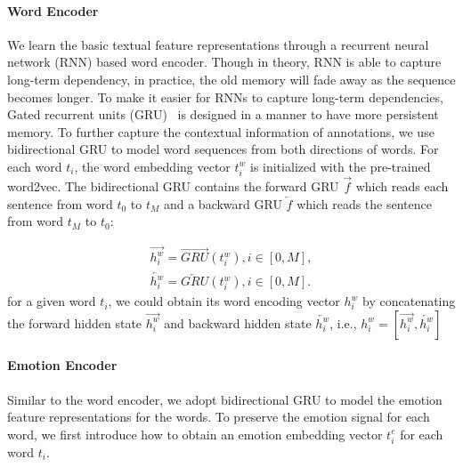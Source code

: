 \documentclass{article}
\begin{document}
	\paragraph{Word Encoder}
	We learn the basic textual feature representations through a recurrent neural network (RNN) based word encoder. Though in theory, RNN is able to capture long-term dependency, in practice, the old memory will fade away as the sequence becomes longer. To make it easier for RNNs to capture long-term dependencies,
	Gated recurrent units (GRU)~\cite{bahdanau2014neural} is designed in a manner to have more persistent memory. To further capture the contextual information of annotations, we use bidirectional GRU to model word sequences
	from both directions of words. For each word $t_i$, the word embedding vector $t_i^w$ is initialized with the pre-trained word2vec\cite{mikolov2013distributed}. The bidirectional GRU contains the forward GRU $\overrightarrow{f}$ which reads each sentence from word $t_0$ to $t_M$ and a backward GRU $\overleftarrow{f}$ which reads the sentence from word $t_M$ to $t_0$:
	
	\begin{equation}
	\begin{aligned}
	\overrightarrow{h_i^w} = \overrightarrow{GRU}(t_i^w), i \in [0, M],\\
	\overleftarrow{h_i^w} = \overleftarrow{GRU}(t_i^w), i\in [0, M].
	\end{aligned}
	\end{equation}%
	for a given word $t_i$, we could obtain its word encoding vector $h_i^w$ by concatenating the forward hidden state $\overrightarrow{h_i^w}$ and backward hidden state $\overleftarrow{h_i^w}$, i.e., $h_i^w=[\overrightarrow{h_i^w}, \overleftarrow{h_i^w}]$
	
	\paragraph{Emotion Encoder}\label{sec:classifier}
	Similar to the word encoder, we adopt bidirectional GRU to model the emotion feature representations for the words. To preserve the emotion signal for each word, we first introduce how to obtain an emotion embedding vector $t_i^e$ for each word $t_i$.
	
\end{document}
